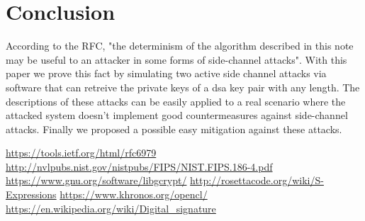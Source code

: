 \documentclass[11pt,english]{article}
\begin{document}
\section{Conclusion}
According to the RFC\cite{rfc}, "the determinism of the algorithm described in this note may be useful to an attacker in some forms of side-channel attacks". With this paper we prove this fact by simulating two active side channel attacks via software that can retreive the private keys of a dsa key pair with any length. The descriptions of these attacks can be easily applied to a real scenario where the attacked system doesn't implement good countermeasures against side-channel attacks. Finally we proposed a possible easy mitigation against these attacks.

\begin{thebibliography}{10}
 \url{https://tools.ietf.org/html/rfc6979}
 \url{http://nvlpubs.nist.gov/nistpubs/FIPS/NIST.FIPS.186-4.pdf}
 \url{https://www.gnu.org/software/libgcrypt/}
 \url{http://rosettacode.org/wiki/S-Expressions}
 \url{https://www.khronos.org/opencl/}
 \url{https://en.wikipedia.org/wiki/Digital_signature}
\end{thebibliography}
\end{document}
